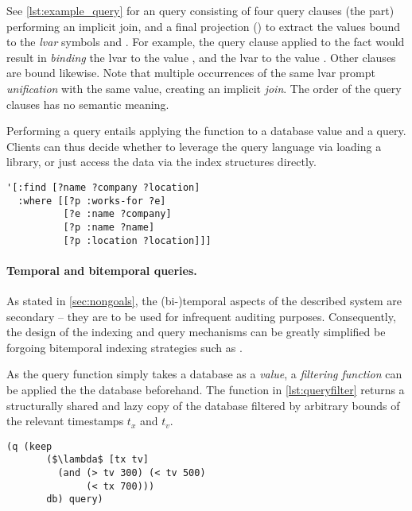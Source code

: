 See \autoref{lst:example_query} for an query consisting of four query clauses (the  part) performing an implicit join, and a final projection () to extract the values bound to the \emph{\gls{lvar}} symbols  and . For example, the query clause  applied to the fact  would result in \emph{binding} the lvar  to the value , and the lvar  to the value . Other clauses are bound likewise. Note that multiple occurrences of the same lvar prompt \emph{unification} with the same value, creating an implicit \emph{join}. The order of the query clauses has no semantic meaning.

Performing a query entails applying the  function to a database value and a query. Clients can thus decide whether to leverage the query language via loading a library, or just access the data via the index structures directly.

\begin{lstlisting}[label={lst:example_query},caption=Example edn Datalog query]
'[:find [?name ?company ?location]
  :where [[?p :works-for ?e]
          [?e :name ?company]
          [?p :name ?name]
          [?p :location ?location]]]
\end{lstlisting}

\paragraph{Temporal and bitemporal queries.}
As stated in \autoref{sec:nongoals}, the (bi-)temporal aspects of the described system are secondary -- they are to be used for infrequent auditing purposes. Consequently, the design of the indexing and query mechanisms can be greatly simplified be forgoing bitemporal indexing strategies such as \cite{nascimento1995ivtt}.

As the query function simply takes a database as a \emph{value}, a \emph{filtering function} can be applied the the database beforehand. The  function in \autoref{lst:queryfilter} returns a structurally shared and lazy copy of the database filtered by arbitrary bounds of the relevant timestamps $t_x$ and $t_v$.

\begin{lstlisting}[label={lst:queryfilter},caption=Applying a temporal filter before querying,morekeywords={keep,q,<,>}]
  (q (keep
       ($\lambda$ [tx tv]
         (and (> tv 300) (< tv 500)
              (< tx 700)))
       db) query)
  \end{lstlisting}


